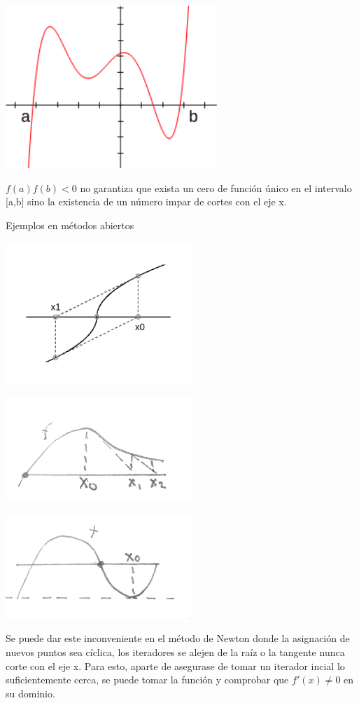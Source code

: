 \documentclass[11pt]{article}
\begin{document}
\begin{center}
    \includegraphics[keepaspectratio, width=8cm]{Problema_MetodoAbierto3.png}
    \caption{\\}
\end{center}  
$f(a)f(b)<0$ no garantiza que exista un cero de función único en el intervalo [a,b] sino la existencia de un número impar de cortes con el eje x.

{\large Ejemplos en métodos abiertos}
\begin{center}
    \includegraphics[keepaspectratio, width=7cm]{Problema_MetodoCerrados.png}
    \caption{\\}
     \includegraphics[keepaspectratio, width=7cm]{Problema_MetodoCerrados2.jpg}
    \caption{\\}
     \includegraphics[keepaspectratio, width=7cm]{Problema_MetodoCerrados3.jpg}
    \caption{\\}
\end{center}   
Se puede dar este inconveniente en el método de Newton donde la asignación de nuevos puntos sea cíclica, los iteradores se alejen de la raíz o la tangente nunca corte con el eje x. Para esto, aparte de asegurase de tomar un iterador incial lo suficientemente cerca, se puede tomar la función y comprobar que $f'(x) \neq 0$ en su dominio. 
\end{document}
